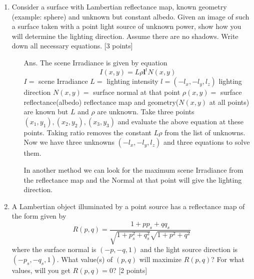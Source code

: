 \documentclass[11pt]{article}
\begin{document}
\maketitle

\begin{enumerate}
\item Consider a surface with Lambertian reflectance map, known geometry (example: sphere) and unknown but constant albedo. Given an image of such a surface taken with a point light source of unknown power, show how you will determine the lighting direction. Assume there are no shadows. Write down all necessary equations. \textsf{[3 points]}
\begin{itemize}
\item[Ans.] The scene Irradiance is given by equation
\begin{equation}
I(x,y) = L \rho \mathbf{l}^t N(x,y)
\end{equation}
$I =$ scene Irradiance \newline
$L =$ lighting intensity \newline
$l = (-l_x,-l_y,l_z)$ lighting direction\newline
$N(x,y) =$ surface normal at that point \newline
$\rho(x,y) =$ surface reflectance(albedo) \newline
reflectance map and geometry($N(x,y)$ at all points) are known but $L$ and $\rho$ are unknown. \newline
Take three points $(x_1,y_1),(x_2,y_2),(x_3,y_3)$ and evaluate the above equation at these points.\newline
Taking ratio removes the constant $L \rho$ from the list of unknowns. Now we have three unknowns $(-l_x,-l_y,l_z)$ and three equations to solve them.\newline

In another method we can look for the maximum scene Irradiance from the reflectance map and the Normal at that point will give the lighting direction. 
\end{itemize} 

\item A Lambertian object illuminated by a point source has a reflectance map of the form given by 
\begin{equation}
R(p,q) = \frac{1+pp_s + qq_s}{\sqrt{1+p^2_s+q^2_s}\sqrt{1+p^2+q^2}}
\end{equation}
where the surface normal is $(-p,-q,1)$ and the light source direction is $(-p_s,-q_s,1)$. What value(s) of $(p,q)$ will maximize $R(p,q)$? For what values, will you get $R(p,q) = 0$? \textsf{[2 points]}


\end{enumerate}
\end{document}
